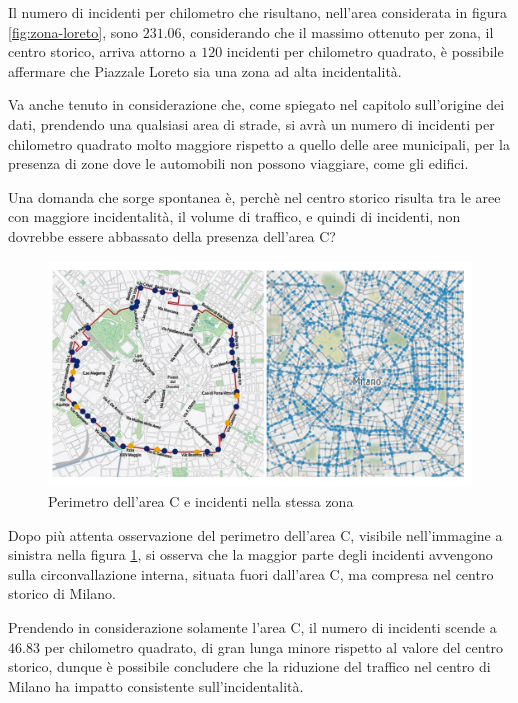 \documentclass[a4paper,12pt]{report}
\begin{document}
Il numero di incidenti per chilometro che risultano, nell'area considerata in figura 
\ref{fig:zona-loreto}, sono $231.06$, considerando che il massimo ottenuto per zona, 
il centro storico, arriva attorno a $120$ incidenti per chilometro quadrato, è possibile affermare 
che Piazzale Loreto sia una zona ad alta incidentalità.

Va anche tenuto in considerazione che, come spiegato nel capitolo sull'origine dei dati, 
prendendo una qualsiasi area di strade, si avrà un numero di incidenti per chilometro quadrato 
molto maggiore rispetto a quello delle aree municipali, per la presenza di zone dove  
le automobili non possono viaggiare, come gli edifici.

Una domanda che sorge spontanea è, perchè nel centro storico risulta tra le aree con maggiore 
incidentalità, il volume di traffico, e quindi di incidenti, non dovrebbe essere abbassato 
della presenza dell'area C?

\begin{figure}
    \includegraphics[width=\linewidth]{../src/area_c/area_c_incidenti.png}
    \caption{Perimetro dell'area C e incidenti nella stessa zona}
    \label{fig:perimetro-area-c}
\end{figure}

Dopo più attenta osservazione del perimetro dell'area C, visibile nell'immagine a sinistra nella 
figura \ref{fig:perimetro-area-c}, si osserva che la maggior parte degli 
incidenti avvengono sulla circonvallazione interna, 
situata fuori dall'area C, ma compresa nel centro storico di Milano.

Prendendo in considerazione solamente l'area C, il numero di incidenti scende a $46.83$ 
per chilometro quadrato, di gran lunga minore rispetto al valore del centro storico, 
dunque è possibile concludere che la riduzione del traffico nel centro di Milano ha impatto 
consistente sull'incidentalità.
\end{document}
